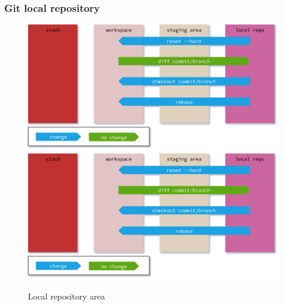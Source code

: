 \begin{frame}[fragile]
    \frametitle{Git local repository}
    \begin{figure}
        \begin{center}
            {
                \includegraphics[width=1\textwidth,keepaspectratio]{./images/GitAreas-LocalRepo.png}
            }
            {
                \includegraphics[height=0.75\textheight,keepaspectratio]{./images/GitAreas-LocalRepo.png}
            }
            \caption{Local repository area}
        \end{center}
    \end{figure}
\end{frame}

